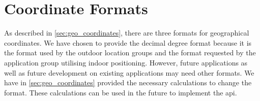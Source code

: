 \section{Coordinate Formats}
As described in \cref{sec:geo_coordinates}, there are three formats for geographical coordinates. We have chosen to provide the decimal degree format because it is the format used by the outdoor location groups and the format requested by the application group utilising indoor positioning.
However, future applications as well as future development on existing applications may need other formats. We have in \cref{sec:geo_coordinates} provided the necessary calculations to change the format. These calculations can be used in the future to implement the api.
